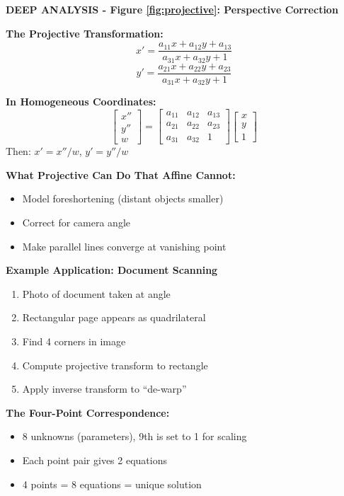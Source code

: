 \documentclass[12pt,a4paper]{article}
\begin{document}
\begin{deepexplanation}
\textbf{DEEP ANALYSIS - Figure \ref{fig:projective}: Perspective Correction}

\textbf{The Projective Transformation:}
\[
x' = \frac{a_{11}x + a_{12}y + a_{13}}{a_{31}x + a_{32}y + 1}
\]
\[
y' = \frac{a_{21}x + a_{22}y + a_{23}}{a_{31}x + a_{32}y + 1}
\]

\textbf{In Homogeneous Coordinates:}
\[
\begin{bmatrix} x'' \\ y'' \\ w \end{bmatrix} = 
\begin{bmatrix} a_{11} & a_{12} & a_{13} \\ a_{21} & a_{22} & a_{23} \\ a_{31} & a_{32} & 1 \end{bmatrix}
\begin{bmatrix} x \\ y \\ 1 \end{bmatrix}
\]
Then: $x' = x''/w$, $y' = y''/w$

\textbf{What Projective Can Do That Affine Cannot:}
\begin{itemize}
    \item Model foreshortening (distant objects smaller)
    \item Correct for camera angle
    \item Make parallel lines converge at vanishing point
\end{itemize}

\textbf{Example Application: Document Scanning}
\begin{enumerate}
    \item Photo of document taken at angle
    \item Rectangular page appears as quadrilateral
    \item Find 4 corners in image
    \item Compute projective transform to rectangle
    \item Apply inverse transform to ``de-warp''
\end{enumerate}

\textbf{The Four-Point Correspondence:}
\begin{itemize}
    \item 8 unknowns (parameters), 9th is set to 1 for scaling
    \item Each point pair gives 2 equations
    \item 4 points = 8 equations = unique solution
\end{itemize}
\end{deepexplanation}
\end{document}

